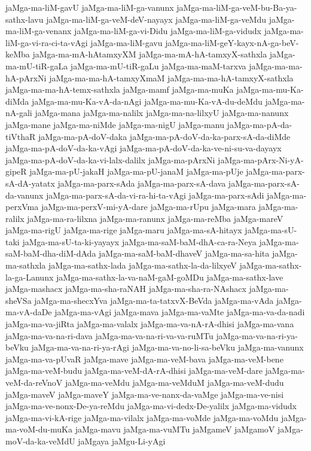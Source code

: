 {jaMga-ma-liM-gavU
jaMga-ma-liM-ga-vanunx
jaMga-ma-liM-ga-veM-bu-Ba-ya-sathx-lavu
jaMga-ma-liM-ga-veM-deV-nayayx
jaMga-ma-liM-ga-veMdu
jaMga-ma-liM-ga-venanx
jaMga-ma-liM-ga-vi-Didu
jaMga-ma-liM-ga-vidudx
jaMga-ma-liM-ga-vi-ra-ci-ta-vAgi
jaMga-ma-liM-gavu
jaMga-ma-liM-geY-kayx-nA-ga-beV-keMba
jaMga-ma-mA-hAtamxyXM
jaMga-ma-mA-hA-tamxyX-sathxla
jaMga-ma-mU-tiR-gaLa
jaMga-ma-mU-tiR-gaLu
jaMga-ma-maM-tarxva
jaMga-ma-ma-hA-pArxNi
jaMga-ma-ma-hA-tamxyXmaM
jaMga-ma-ma-hA-tamxyX-sathxla
jaMga-ma-ma-hA-temx-sathxla
jaMga-mamf
jaMga-ma-muKa
jaMga-ma-mu-Ka-diMda
jaMga-ma-mu-Ka-vA-da-nAgi
jaMga-ma-mu-Ka-vA-du-deMdu
jaMga-ma-nA-gali
jaMga-mana
jaMga-ma-nalilx
jaMga-ma-na-lilxyU
jaMga-ma-nanunx
jaMga-mane
jaMga-ma-niMde
jaMga-ma-nigU
jaMga-manu
jaMga-ma-pA-da-tiVthaR
jaMga-ma-pA-doV-daka
jaMga-ma-pA-doV-da-ka-parx-sA-da-diMde
jaMga-ma-pA-doV-da-ka-vAgi
jaMga-ma-pA-doV-da-ka-ve-ni-su-va-dayayx
jaMga-ma-pA-doV-da-ka-vi-lalx-dalilx
jaMga-ma-pArxNi
jaMga-ma-pArx-Ni-yA-gipeR
jaMga-ma-pU-jakaH
jaMga-ma-pU-janaM
jaMga-ma-pUje
jaMga-ma-parx-sA-dA-yatatx
jaMga-ma-parx-sAda
jaMga-ma-parx-sA-dava
jaMga-ma-parx-sA-da-vanunx
jaMga-ma-parx-sA-da-vi-ra-hi-ta-vAgi
jaMga-ma-parx-sAdi
jaMga-ma-perxVma
jaMga-ma-perxV-mi-yA-dare
jaMga-ma-rUpu
jaMga-mara
jaMga-ma-ralilx
jaMga-ma-ra-lilxna
jaMga-ma-ranunx
jaMga-ma-reMba
jaMga-mareV
jaMga-ma-rigU
jaMga-ma-rige
jaMga-maru
jaMga-ma-sA-hitayx
jaMga-ma-sU-taki
jaMga-ma-sU-ta-ki-yayayx
jaMga-ma-saM-baM-dhA-ca-ra-Neya
jaMga-ma-saM-baM-dha-diM-dAda
jaMga-ma-saM-baM-dhaveV
jaMga-ma-sa-hita
jaMga-ma-sathxla
jaMga-ma-sathx-lada
jaMga-ma-sathx-la-da-lilxyeV
jaMga-ma-sathx-la-ga-Lanunx
jaMga-ma-sathx-la-va-naM-gaM-goMDu
jaMga-ma-sathx-lave
jaMga-mashacx
jaMga-ma-sha-raNAH
jaMga-ma-sha-ra-NAshacx
jaMga-ma-sheVSa
jaMga-ma-shecxYva
jaMga-ma-ta-tatxvX-BeVda
jaMga-ma-vAda
jaMga-ma-vA-daDe
jaMga-ma-vAgi
jaMga-mava
jaMga-ma-vaMte
jaMga-ma-va-da-nadi
jaMga-ma-va-jiRta
jaMga-ma-valalx
jaMga-ma-va-nA-rA-dhisi
jaMga-ma-vana
jaMga-ma-va-na-ri-dava
jaMga-ma-va-na-ri-va-va-ruMTu
jaMga-ma-va-na-ri-ya-beVku
jaMga-ma-va-na-ri-ya-rAgi
jaMga-ma-va-no-li-sa-beVku
jaMga-ma-vanunx
jaMga-ma-va-pUvaR
jaMga-mave
jaMga-ma-veM-bava
jaMga-ma-veM-bene
jaMga-ma-veM-budu
jaMga-ma-veM-dA-rA-dhisi
jaMga-ma-veM-dare
jaMga-ma-veM-da-reVnoV
jaMga-ma-veMdu
jaMga-ma-veMduM
jaMga-ma-veM-dudu
jaMga-maveV
jaMga-maveY
jaMga-ma-ve-nanx-da-vaMge
jaMga-ma-ve-nisi
jaMga-ma-ve-nonx-De-ya-reMdu
jaMga-ma-vi-dedx-De-yalilx
jaMga-ma-vidudx
jaMga-ma-vi-kA-rige
jaMga-ma-vilalx
jaMga-ma-voMde
jaMga-ma-voMdu
jaMga-ma-voM-du-muKa
jaMga-mavu
jaMga-ma-vuMTu
jaMgameV
jaMgamoV
jaMga-moV-da-ka-veMdU
jaMgaya
jaMgu-Li-yAgi
}
